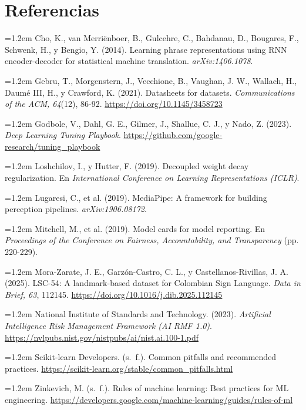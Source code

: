 \documentclass[11pt,a4paper]{article}
\begin{document}
\section*{Referencias}
\sloppy\footnotesize
\setlength{\parskip}{2pt}
\noindent\hangindent=1.2em Cho, K., van Merriënboer, B., Gulcehre, C., Bahdanau, D., Bougares, F., Schwenk, H., y Bengio, Y. (2014). Learning phrase representations using RNN encoder-decoder for statistical machine translation. \emph{arXiv:1406.1078}.\par
\noindent\hangindent=1.2em Gebru, T., Morgenstern, J., Vecchione, B., Vaughan, J. W., Wallach, H., Daumé III, H., y Crawford, K. (2021). Datasheets for datasets. \emph{Communications of the ACM, 64}(12), 86-92. \url{https://doi.org/10.1145/3458723}\par
\noindent\hangindent=1.2em Godbole, V., Dahl, G. E., Gilmer, J., Shallue, C. J., y Nado, Z. (2023). \emph{Deep Learning Tuning Playbook}. \url{https://github.com/google-research/tuning_playbook}\par
\noindent\hangindent=1.2em Loshchilov, I., y Hutter, F. (2019). Decoupled weight decay regularization. En \emph{International Conference on Learning Representations (ICLR)}.\par
\noindent\hangindent=1.2em Lugaresi, C., et al. (2019). MediaPipe: A framework for building perception pipelines. \emph{arXiv:1906.08172}.\par
\noindent\hangindent=1.2em Mitchell, M., et al. (2019). Model cards for model reporting. En \emph{Proceedings of the Conference on Fairness, Accountability, and Transparency} (pp. 220-229).\par
\noindent\hangindent=1.2em Mora-Zarate, J. E., Garzón-Castro, C. L., y Castellanos-Rivillas, J. A. (2025). LSC-54: A landmark-based dataset for Colombian Sign Language. \emph{Data in Brief, 63}, 112145. \url{https://doi.org/10.1016/j.dib.2025.112145}\par
\noindent\hangindent=1.2em National Institute of Standards and Technology. (2023). \emph{Artificial Intelligence Risk Management Framework (AI RMF 1.0)}. \url{https://nvlpubs.nist.gov/nistpubs/ai/nist.ai.100-1.pdf}\par
\noindent\hangindent=1.2em Scikit-learn Developers. (s.~f.). Common pitfalls and recommended practices. \url{https://scikit-learn.org/stable/common_pitfalls.html}\par
\noindent\hangindent=1.2em Zinkevich, M. (s.~f.). Rules of machine learning: Best practices for ML engineering. \url{https://developers.google.com/machine-learning/guides/rules-of-ml}\par
\end{document}
